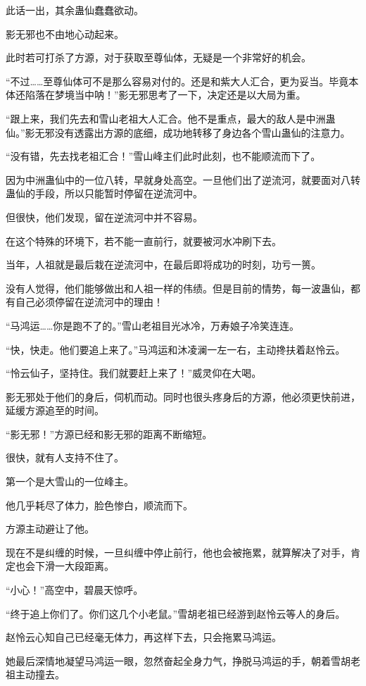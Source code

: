 \begin{this_body}
此话一出，其余蛊仙蠢蠢欲动。

影无邪也不由地心动起来。

此时若可打杀了方源，对于获取至尊仙体，无疑是一个非常好的机会。

“不过……至尊仙体可不是那么容易对付的。还是和紫大人汇合，更为妥当。毕竟本体还陷落在梦境当中呐！”影无邪思考了一下，决定还是以大局为重。

“跟上来，我们先去和雪山老祖大人汇合。他不是重点，最大的敌人是中洲蛊仙。”影无邪没有透露出方源的底细，成功地转移了身边各个雪山蛊仙的注意力。

“没有错，先去找老祖汇合！”雪山峰主们此时此刻，也不能顺流而下了。

因为中洲蛊仙中的一位八转，早就身处高空。一旦他们出了逆流河，就要面对八转蛊仙的手段，所以只能暂时停留在逆流河中。

但很快，他们发现，留在逆流河中并不容易。

在这个特殊的环境下，若不能一直前行，就要被河水冲刷下去。

当年，人祖就是最后栽在逆流河中，在最后即将成功的时刻，功亏一篑。

没有人觉得，他们能够做出和人祖一样的伟绩。但是目前的情势，每一波蛊仙，都有自己必须停留在逆流河中的理由！

“马鸿运……你是跑不了的。”雪山老祖目光冰冷，万寿娘子冷笑连连。

“快，快走。他们要追上来了。”马鸿运和沐凌澜一左一右，主动搀扶着赵怜云。

“怜云仙子，坚持住。我们就要赶上来了！”威灵仰在大喝。

影无邪处于他们的身后，伺机而动。同时也很头疼身后的方源，他必须更快前进，延缓方源追至的时间。

“影无邪！”方源已经和影无邪的距离不断缩短。

很快，就有人支持不住了。

第一个是大雪山的一位峰主。

他几乎耗尽了体力，脸色惨白，顺流而下。

方源主动避让了他。

现在不是纠缠的时候，一旦纠缠中停止前行，他也会被拖累，就算解决了对手，肯定也会下滑一大段距离。

“小心！”高空中，碧晨天惊呼。

“终于追上你们了。你们这几个小老鼠。”雪胡老祖已经游到赵怜云等人的身后。

赵怜云心知自己已经毫无体力，再这样下去，只会拖累马鸿运。

她最后深情地凝望马鸿运一眼，忽然奋起全身力气，挣脱马鸿运的手，朝着雪胡老祖主动撞去。

\end{this_body}


